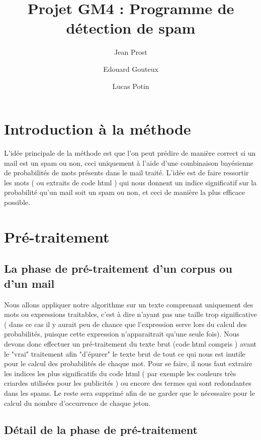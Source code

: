 \documentclass{article}
\title{Projet GM4 : Programme de détection de spam}
\author{Jean Prost \and Edouard Gouteux \and Lucas Potin}
\begin{document}
\maketitle
 
\section{Introduction à la méthode}

L'idée principale de la méthode est que l'on peut prédire de manière correct si un mail est un spam ou non, ceci uniquement à l'aide d'une combinaison bayésienne de probabilités de mots présents dans le mail traité. L'idée est de faire ressortir les mots ( ou extraits de code html ) qui nous donnent un indice significatif sur la probabilité qu'un mail soit un spam ou non, et ceci de manière la plus efficace possible. 

\section{Pré-traitement}

\subsection{La phase de pré-traitement d'un corpus ou d'un mail}

Nous allons appliquer notre algorithme sur un texte comprenant uniquement des mots ou expressions traitables, c'est à dire n'ayant pas une taille trop significative ( dans ce cas il y aurait peu de chance que l'expression serve lors du calcul des probabilités, puisque cette expression n'apparaitrait qu'une seule fois). Nous devons donc effectuer un pré-traitement du texte brut (code html compris ) avant le "vrai" traitement afin "d'épurer" le texte brut de tout ce qui nous est inutile pour le calcul des probabilités de chaque mot. 
Pour se faire, il nous faut extraire les indices les plus significatifs du code html ( par exemple les couleurs très criardes utilisées pour les publicités ) ou encore des termes qui sont redondantes dans les spams. Le reste sera supprimé afin de ne garder que le nécessaire pour le calcul du nombre d'occurrence de chaque jeton. 

\subsection{Détail de la phase de pré-traitement}
\end{document}
